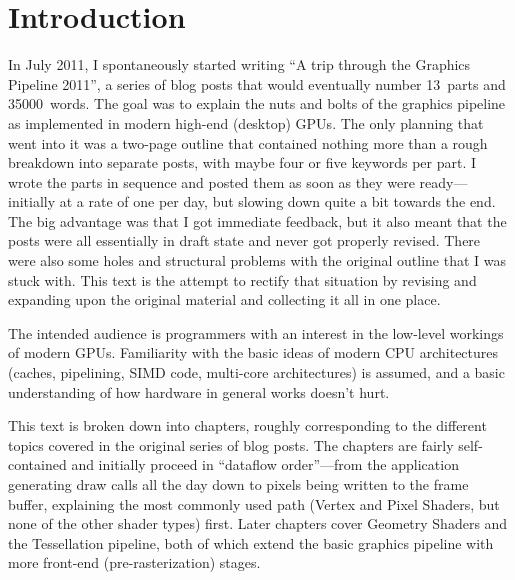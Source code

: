 \chapter{Introduction}
\label{ch:intro}
In July 2011, I spontaneously started writing ``A trip through the Graphics Pipeline 2011'', a series of
blog posts that would eventually number 13~parts and 35000~words. The goal was to explain the nuts and bolts
of the graphics pipeline as implemented in modern high-end (desktop) GPUs. The only planning that went into it
was a two-page outline that contained nothing more than a rough breakdown into separate posts, with
maybe four or five keywords per part. I wrote the parts in sequence and posted them as soon as they were
ready---initially at a rate of one per day, but slowing down quite a bit towards the end. The big advantage
was that I got immediate feedback, but it also meant that the posts were all essentially in draft state and
never got properly revised. There were also some holes and structural problems with the original outline that
I was stuck with. This text is the attempt to rectify that situation by revising and expanding upon the original
material and collecting it all in one place.

The intended audience is programmers with an interest in the low-level workings of modern GPUs. Familiarity with
the basic ideas of modern CPU architectures (caches, pipelining, SIMD code, multi-core architectures) is assumed,
and a basic understanding of how hardware in general works doesn't hurt.

This text is broken down into chapters, roughly corresponding to the different topics covered in the original
series of blog posts. The chapters are fairly self-contained and initially proceed in ``dataflow order''---from the
application generating draw calls all the day down to pixels being written to the frame buffer, explaining the most
commonly used path (Vertex and Pixel Shaders, but none of the other shader types) first. Later chapters cover Geometry
Shaders and the Tessellation pipeline, both of which extend the basic graphics pipeline with more front-end
(pre-rasterization) stages.
